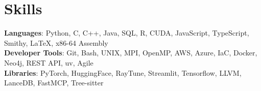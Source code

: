 \documentclass[letterpaper,11pt]{article}
\begin{document}
%
\section{Skills}
 \begin{itemize}[leftmargin=0.15in, label={}]
    \small{\item{
     \textbf{Languages}{: Python, C, C++, Java, SQL, R, CUDA, JavaScript, TypeScript, Smithy, LaTeX, x86-64 Assembly} \\
     \textbf{Developer Tools}{: Git, Bash, UNIX, MPI, OpenMP, AWS, Azure, IaC, Docker, Neo4j, REST API, uv, Agile} \\
     \textbf{Libraries}{: PyTorch, HuggingFace, RayTune, Streamlit, Tensorflow, LLVM, LanceDB, FastMCP, Tree-sitter} \\
    }}
 \end{itemize}


\end{document}
